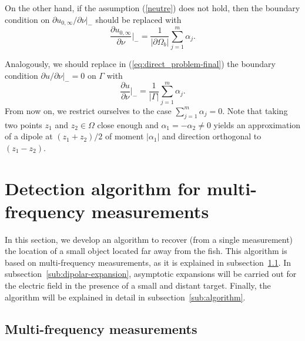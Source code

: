 \documentclass[final]{siamltex}
\numberwithin{equation}{section}
\numberwithin{figure}{section}
\numberwithin{table}{section}
\begin{document}
On the other hand, if the assumption (\ref{neutre}) does not hold,
then the boundary condition on ${\partial
u_{0,\infty}}/{\partial\nu}\big|_{-}$ should be replaced with
$$
\frac{\partial u_{0,\infty}}{\partial\nu}\bigg|_{-} =
\frac{1}{|\partial \Omega_b|} \sum_{j=1}^m \alpha_j.
$$

Analogously, we should replace in (\ref{eq:direct_problem-final})
the boundary condition ${\partial u}/{\partial\nu}\big|_{-} =0$ on
$\Gamma$ with $$\frac{\partial u}{\partial\nu}\big|_{-} =
\frac{1}{|\Gamma|} \sum_{j=1}^m \alpha_j.$$ From now on, we
restrict ourselves to the case $\sum_{j=1}^m \alpha_j =0$. Note
that taking two points $z_1$ and $z_2 \in \Omega$ close enough and
$\alpha_1 = - \alpha_2 \neq 0$ yields an approximation of a dipole
at $(z_1+z_2)/2$ of moment $|\alpha_1|$ and direction orthogonal
to $(z_1-z_2)$.



\section{Detection algorithm for multi-frequency measurements}

\label{sec:detection_algo}

In this section, we develop an algorithm to recover (from a single
measurement) the location of a small object located far away from
the fish. This algorithm is based on multi-frequency measurements,
as it is explained in subsection~\ref{sub:multifreq}. In
subsection~\ref{sub:dipolar-expansion}, asymptotic expansions will
be carried out for the electric field in the presence of a small
and distant target. Finally, the algorithm will be explained in
detail in subsection~\ref{sub:algorithm}.


\subsection{Multi-frequency measurements}

\label{sub:multifreq}
\end{document}
